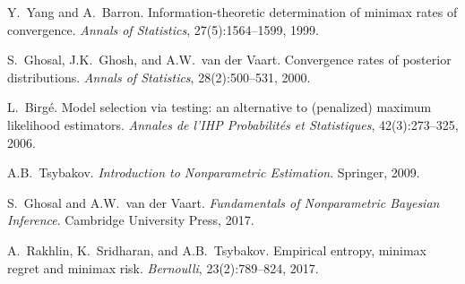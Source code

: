 \documentclass[11pt]{article}
\theoremstyle{definition}
\begin{document}
\begin{enumerate}[label={[\arabic*]}]
    \item Y.~Yang and A.~Barron. Information-theoretic determination of minimax rates of convergence. \textit{Annals of Statistics}, 27(5):1564--1599, 1999.
    
    \item S.~Ghosal, J.K.~Ghosh, and A.W.~van der Vaart. Convergence rates of posterior distributions. \textit{Annals of Statistics}, 28(2):500--531, 2000.
    
    \item L.~Birgé. Model selection via testing: an alternative to (penalized) maximum likelihood estimators. \textit{Annales de l'IHP Probabilités et Statistiques}, 42(3):273--325, 2006.
    
    \item A.B.~Tsybakov. \textit{Introduction to Nonparametric Estimation}. Springer, 2009.
    
    \item S.~Ghosal and A.W.~van der Vaart. \textit{Fundamentals of Nonparametric Bayesian Inference}. Cambridge University Press, 2017.
    
    \item A.~Rakhlin, K.~Sridharan, and A.B.~Tsybakov. Empirical entropy, minimax regret and minimax risk. \textit{Bernoulli}, 23(2):789--824, 2017.
\end{enumerate}
\end{document}
